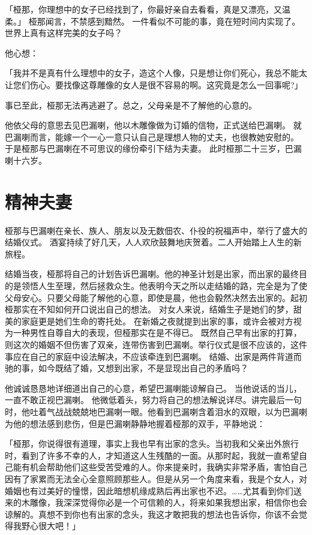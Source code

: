 \documentclass[twoside,openany]{book}
\begin{document}
「桠那，你理想中的女子已经找到了，你最好亲自去看看，真是又漂亮，又温柔。」
桠那闻言，不禁感到黯然。
一件看似不可能的事，竟在短时间内实现了。
世界上真有这样完美的女子吗？

他心想：

「我并不是真有什么理想中的女子，造这个人像，只是想让你们死心，我总不能太让您们伤心。要找像这尊雕像的女人是很不容易的啊。这究竟是怎么一回事呢?」

事已至此，桠那无法再逃避了。总之，父母亲是不了解他的心意的。

他依父母的意思去见巴漏喇，他以木雕像做为订婚的信物，正式送给巴漏喇。
就巴漏喇而言，能嫁一个一心一意只认自己是理想人物的丈夫，也很教她安慰的。
于是桠那与巴漏喇在不可思议的缘份牵引下结为夫妻。
此时桠那二十三岁，巴漏喇十六岁。

\section{精神夫妻}\label{sec4.3}

桠那与巴漏喇在亲长、族人、朋友以及无数佃农、仆役的祝福声中，举行了盛大的结婚仪式。
酒宴持续了好几天，人人欢欣鼓舞地庆贺着。二人开始踏上人生的新旅程。

结婚当夜，桠那将自己的计划告诉巴漏喇。他的神圣计划是出家，而出家的最终目的是领悟人生至理，然后拯救众生。他表明今天之所以走结婚的路，完全是为了使父母安心。只要父母能了解他的心意，即使是晨，他也会毅然决然去出家的。起初桠那实在不知如何开口说出自己的想法。
对女人来说，结婚生子是她们的梦，甜美的家庭更是她们生命的寄托处。
在新婚之夜就提到出家的事，或许会被对方视为一种男性自尊自大的表现，但桠那实在是不得已。
既然自己早有出家的打算，则这次的婚姻不但伤害了双亲，连带伤害到巴漏喇。举行仪式是很不应该的，这件事应在自己的家庭中设法解决，不应该牵连到巴漏喇。
结婚、出家是两件背道而驰的事，如今既结了婚，又想到出家，不是显现出自己的矛盾吗？

他诚诚恳恳地详细道出自己的心意，希望巴漏喇能谅解自己。
当他说话的当儿，一直不敢正视巴漏喇。
他微低着头，努力将自己的想法解说详尽。讲完最后一句时，他吐着气战战兢兢地巴漏喇一眼。他看到巴漏喇含着泪水的双眼，以为巴漏喇为他的想法感到悲伤，但是巴漏喇静静地握着桠那的双手，平静地说：

「桠那，你说得很有道理，事实上我也早有出家的念头。当初我和父亲出外旅行时，看到了许多不幸的人，才知道这人生残酷的一面。从那时起，我就一直希望自己能有机会帮助他们这些受苦受难的人。你来提亲时，我确实非常矛盾，害怕自己因有了家累而无法全心全意照顾那些人。但是从另一个角度来看，我是个女人，对婚姻也有过美好的憧憬，因此暗想机缘成熟后再出家也不迟。……尤其看到你们送来的木雕像，我深深觉得你必是一个可信赖的人，将来如果我想出家，相信你也会谅解的。真想不到你也有出家的念头，我这才敢把我的想法也告诉你，你该不会觉得我野心很大吧！」
\end{document}
